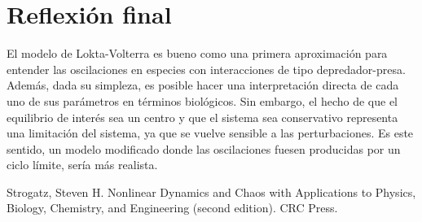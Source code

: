 \documentclass[10pt,twocolumn]{article}
\begin{document}
\section{Reflexión final}

El modelo de Lokta-Volterra es bueno como una primera aproximación para entender las oscilaciones en especies con interacciones de tipo depredador-presa. Además, dada su simpleza, es posible hacer una interpretación directa de cada uno de sus parámetros en términos biológicos. Sin embargo, el hecho de que el equilibrio de interés sea un centro y que el sistema sea conservativo representa una limitación del sistema, ya que se vuelve sensible a las perturbaciones. Es este sentido, un modelo modificado donde las oscilaciones fuesen producidas por un ciclo límite, sería más realista.


\begin{thebibliography}{9}
Strogatz, Steven H. Nonlinear Dynamics and Chaos with Applications to Physics, Biology, Chemistry, and Engineering (second edition). CRC Press.
\end{thebibliography}
\end{document}
